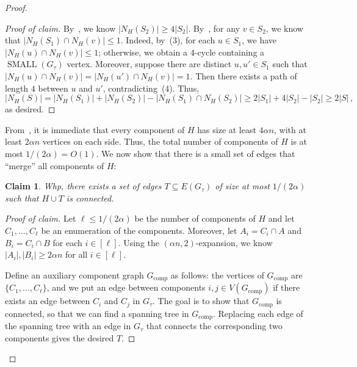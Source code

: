 \documentclass[reqno,final,a4paper]{amsart}
\numberwithin{equation}{section}
\newtheorem{claim}[theorem]{Claim}
\theoremstyle{definition}
\theoremstyle{remark}
\newcommand{\SMA}{\operatorname{SMALL}}
\newenvironment{proofclaim}[1][Proof of claim]{\begin{proof}[#1]\renewcommand*{\qedsymbol}{\(\blacksquare\)}}{\end{proof}}
\begin{document}
\begin{proof}
\begin{proofclaim}
        By~, we know $|N_{H}(S_2)|\geq 4|S_2|$. By~, for any $v\in S_2$, we know that $|N_{H}(S_1)\cap N_{H}(v)|\leq 1$.
        Indeed, by~(3), for each $u \in S_1$, we have $|N_H(u)\cap N_H(v)|\leq 1$; otherwise, we obtain a $4$-cycle containing a $\SMA(G_\tau)$ vertex. Moreover, suppose there are distinct $u,u'\in S_1$ such that $|N_H(u)\cap N_H(v)| = |N_H(u')\cap N_H(v)| =  1$. Then there exists a path of length $4$ between $u$ and $u'$, contradicting~(4).
        Thus, $$|N_H(S)| = |N_H(S_1)| + |N_H(S_2)| - |N_H(S_1)\cap N_H(S_2)| \geq 2|S_1| + 4|S_2| - |S_2| \geq 2|S|\,,$$
        as desired.
    \end{proofclaim}
    From~, it is immediate that every component of $H$ has size at least $4\alpha n$, with at least $2\alpha n$ vertices on each side.
    Thus, the total number of components of $H$ is at most $1/(2\alpha) = O(1)$.
    We now show that there is a small set of edges that ``merge'' all components of $H$:
    \begin{claim}
        Whp, there exists a set of edges $T\subseteq E(G_\tau)$ of size at most $1/(2\alpha)$ such that $H\cup T$ is connected.
    \end{claim}
    \begin{proofclaim}
        Let $\ell\leq 1/(2\alpha)$ be the number of components of $H$ and let $C_1,\dots, C_\ell$ be an enumeration of the components. Moreover, let $A_i = C_i\cap A$ and $B_i = C_i\cap B$ for each $i\in [\ell]$. Using the $(\alpha n,2)$-expansion, we know $|A_i|,|B_i|\geq 2\alpha n$ for all $i\in [\ell]$.

        Define an auxiliary component graph $G_{\mathrm{comp}}$ as follows: the vertices of $G_{\mathrm{comp}}$ are $\{C_1,\dots, C_\ell\}$, and we put an edge between components $i,j\in V(G_{\mathrm{comp}})$ if there exists an edge between $C_i$ and $C_j$ in $G_\tau$. The goal is to show that $G_{\mathrm{comp}}$ is connected, so that we can find a spanning tree in $G_{\mathrm{comp}}$. Replacing each edge of the spanning tree with an edge in $G_\tau$ that connects the corresponding two components gives the desired $T$.


\end{proofclaim}
\end{proof}
\end{document}
